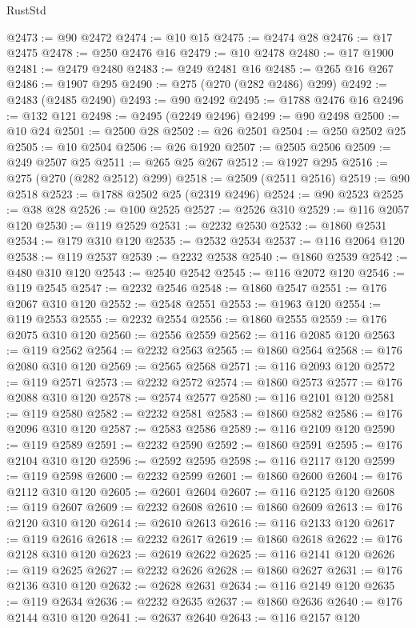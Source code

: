 \begin{lexlean}{RustStd}
\begin{coremodule}
@2473 := @90 @2472
@2474 := @10 @15
@2475 := @2474 @28
@2476 := @17 @2475
@2478 := @250 @2476 @16
@2479 := @10 @2478
@2480 := @17 @1900
@2481 := @2479 @2480
@2483 := @249 @2481 @16
@2485 := @265 @16 @267
@2486 := @1907 @295
@2490 := @275 (@270 (@282 @2486) @299)
@2492 := @2483 (@2485 @2490)
@2493 := @90 @2492
@2495 := @1788 @2476 @16
@2496 := @132 @121
@2498 := @2495 (@2249 @2496)
@2499 := @90 @2498
@2500 := @10 @24
@2501 := @2500 @28
@2502 := @26 @2501
@2504 := @250 @2502 @25
@2505 := @10 @2504
@2506 := @26 @1920
@2507 := @2505 @2506
@2509 := @249 @2507 @25
@2511 := @265 @25 @267
@2512 := @1927 @295
@2516 := @275 (@270 (@282 @2512) @299)
@2518 := @2509 (@2511 @2516)
@2519 := @90 @2518
@2523 := @1788 @2502 @25 (@2319 @2496)
@2524 := @90 @2523
@2525 := @38 @28
@2526 := @100 @2525
@2527 := @2526 @310
@2529 := @116 @2057 @120
@2530 := @119 @2529
@2531 := @2232 @2530
@2532 := @1860 @2531
@2534 := @179 @310 @120
@2535 := @2532 @2534
@2537 := @116 @2064 @120
@2538 := @119 @2537
@2539 := @2232 @2538
@2540 := @1860 @2539
@2542 := @480 @310 @120
@2543 := @2540 @2542
@2545 := @116 @2072 @120
@2546 := @119 @2545
@2547 := @2232 @2546
@2548 := @1860 @2547
@2551 := @176 @2067 @310 @120
@2552 := @2548 @2551
@2553 := @1963 @120
@2554 := @119 @2553
@2555 := @2232 @2554
@2556 := @1860 @2555
@2559 := @176 @2075 @310 @120
@2560 := @2556 @2559
@2562 := @116 @2085 @120
@2563 := @119 @2562
@2564 := @2232 @2563
@2565 := @1860 @2564
@2568 := @176 @2080 @310 @120
@2569 := @2565 @2568
@2571 := @116 @2093 @120
@2572 := @119 @2571
@2573 := @2232 @2572
@2574 := @1860 @2573
@2577 := @176 @2088 @310 @120
@2578 := @2574 @2577
@2580 := @116 @2101 @120
@2581 := @119 @2580
@2582 := @2232 @2581
@2583 := @1860 @2582
@2586 := @176 @2096 @310 @120
@2587 := @2583 @2586
@2589 := @116 @2109 @120
@2590 := @119 @2589
@2591 := @2232 @2590
@2592 := @1860 @2591
@2595 := @176 @2104 @310 @120
@2596 := @2592 @2595
@2598 := @116 @2117 @120
@2599 := @119 @2598
@2600 := @2232 @2599
@2601 := @1860 @2600
@2604 := @176 @2112 @310 @120
@2605 := @2601 @2604
@2607 := @116 @2125 @120
@2608 := @119 @2607
@2609 := @2232 @2608
@2610 := @1860 @2609
@2613 := @176 @2120 @310 @120
@2614 := @2610 @2613
@2616 := @116 @2133 @120
@2617 := @119 @2616
@2618 := @2232 @2617
@2619 := @1860 @2618
@2622 := @176 @2128 @310 @120
@2623 := @2619 @2622
@2625 := @116 @2141 @120
@2626 := @119 @2625
@2627 := @2232 @2626
@2628 := @1860 @2627
@2631 := @176 @2136 @310 @120
@2632 := @2628 @2631
@2634 := @116 @2149 @120
@2635 := @119 @2634
@2636 := @2232 @2635
@2637 := @1860 @2636
@2640 := @176 @2144 @310 @120
@2641 := @2637 @2640
@2643 := @116 @2157 @120

\end{coremodule}
\end{lexlean}
